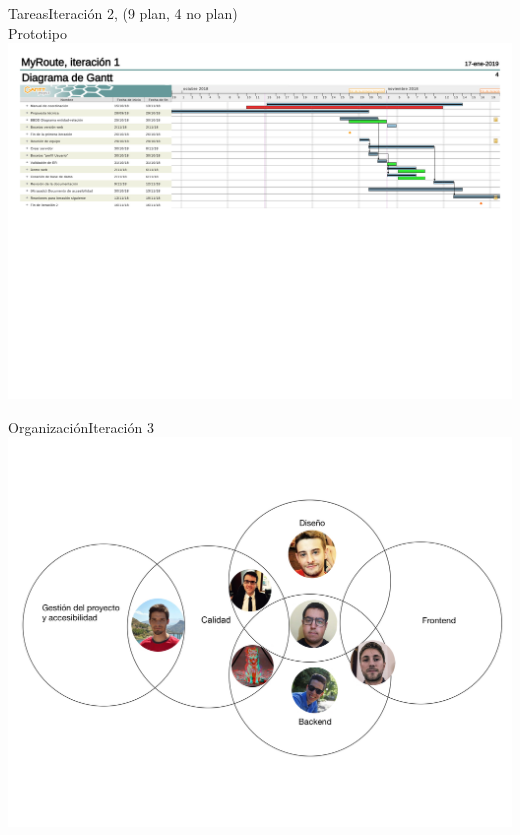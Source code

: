 \documentclass{beamer}
\begin{document}
\begin{frame}{Tareas}{Iteraci\'on 2, (9 plan, 4 no plan)\\
Prototipo}
\centering
\hspace{1cm}
\\[1cm]
\includegraphics[width=0.8\paperwidth]{images_latex/gantt_itr2}
\end{frame}



\begin{frame}{Organizaci\'on}{Iteraci\'on 3}
\includegraphics[scale=0.1]{images_latex/org_itr3}
\end{frame}
\end{document}
